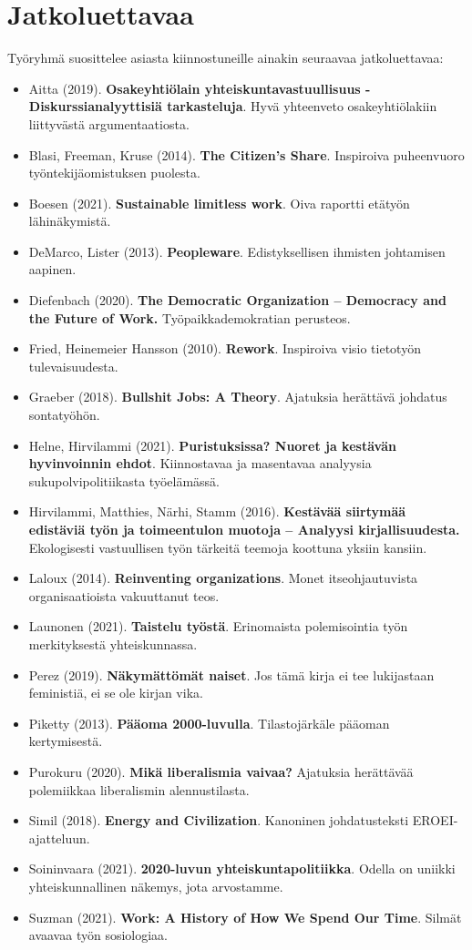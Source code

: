 \documentclass[nobib,finnish,oneside,openany,notoc,a4paper]{tufte-book}
\begin{document}
\part{Jatkoluettavaa}

Työryhmä suosittelee asiasta kiinnostuneille ainakin seuraavaa jatkoluettavaa:

\begin{itemize}
    \item Aitta (2019). \textbf{Osakeyhtiölain yhteiskuntavastuullisuus - Diskurssianalyyttisiä tarkasteluja}. Hyvä yhteenveto osakeyhtiölakiin liittyvästä argumentaatiosta.
    \item Blasi, Freeman, Kruse (2014). \textbf{The Citizen's Share}. Inspiroiva puheenvuoro työntekijäomistuksen puolesta.
    \item Boesen (2021). \textbf{Sustainable limitless work}. Oiva raportti etätyön lähinäkymistä.
    \item DeMarco, Lister (2013). \textbf{Peopleware}. Edistyksellisen ihmisten johtamisen aapinen.
    \item Diefenbach (2020). \textbf{The Democratic Organization – Democracy and the Future of Work.} Työpaikkademokratian perusteos.
    \item Fried, Heinemeier Hansson (2010). \textbf{Rework}. Inspiroiva visio tietotyön tulevaisuudesta.
    \item Graeber (2018). \textbf{Bullshit Jobs: A Theory}. Ajatuksia herättävä johdatus sontatyöhön. 
    \item Helne, Hirvilammi (2021). \textbf{Puristuksissa? Nuoret ja kestävän hyvinvoinnin ehdot}. Kiinnostavaa ja masentavaa analyysia sukupolvipolitiikasta työelämässä.
    \item Hirvilammi, Matthies, Närhi, Stamm (2016). \textbf{Kestävää siirtymää edistäviä työn ja toimeentulon muotoja – Analyysi kirjallisuudesta.} Ekologisesti vastuullisen työn tärkeitä teemoja koottuna yksiin kansiin.
    \item Laloux (2014). \textbf{Reinventing organizations}. Monet itseohjautuvista organisaatioista vakuuttanut teos.
    \item Launonen (2021). \textbf{Taistelu työstä}. Erinomaista polemisointia työn merkityksestä yhteiskunnassa.
    \item Perez (2019). \textbf{Näkymättömät naiset}. Jos tämä kirja ei tee lukijastaan feministiä, ei se ole kirjan vika.
    \item Piketty (2013). \textbf{Pääoma 2000-luvulla}. Tilastojärkäle pääoman kertymisestä.
    \item Purokuru (2020). \textbf{Mikä liberalismia vaivaa?} Ajatuksia herättävää polemiikkaa liberalismin alennustilasta.
    \item Simil (2018). \textbf{Energy and Civilization}. Kanoninen johdatusteksti EROEI-ajatteluun.
    \item Soininvaara (2021). \textbf{2020-luvun yhteiskuntapolitiikka}. Odella on uniikki yhteiskunnallinen näkemys, jota arvostamme.
    \item Suzman (2021). \textbf{Work: A History of How We Spend Our Time}. Silmät avaavaa työn sosiologiaa.
\end{itemize}
\end{document}

